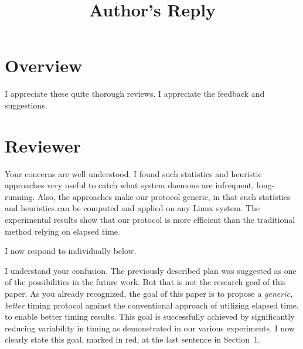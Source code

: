 \documentclass[10pt,letterpaper]{article}
\newenvironment{myindentpar}[1]%
{\begin{list}{}
         {\vspace{10pt}
					\setlength{\leftmargin}{#1}}
          \item[]
}
{\end{list}}
\newcommand{\rev}[1]{\begin{myindentpar}{.25in} {\em {\color{blue}{#1}}}\end{myindentpar}}
\begin{document}
\title{Author's Reply}
\author{}
\maketitle

\section*{Overview}\label{sec:overview}
I appreciate these quite thorough reviews. I appreciate the feedback and suggestions.


\clearpage
\section*{Reviewer}\label{sec:rev1}

\rev{
$<<$ Reviewer's comments to the author(s) $>>$

The SEDONA is based on the probability that any daemons run during the
measurement. And cutoff time is based on the actual measurement time.
The proposed approach is interesting, but I cannot understand why the
author employs such statistics and heuristic way, and how efficient the
proposed approach will work. Please refer to my comments, and consider
to revise the manuscript and re-submit .
}

Your concerns are well understood. I found such statistics and heuristic approaches 
very useful to catch what system daemons are infrequent, long-running. 
Also, the approaches make our protocol generic, in that 
such statistics and heuristics can be computed and 
applied on any Linux system. The experimental results show that 
our protocol is more efficient than the traditional method relying on elapsed time. 

I now respond to individually below.

\rev{
Comments: 
(1) In the last of the manuscript, the author describes ``Our plan is to
integrate SEDONA into the query timing protocol [8]." If the research
goal is the combination of the SEDONA and the query timing protocol,
the proposed approach may be suitable. However, the goal is not
clearly described in the manuscript. The readers will recognize the
SEDONA is a generic protocol. If the research goal is the combination
of this work and the prior work, the author should mention so.
}

I understand your confusion. The previously described plan was suggested as one of the possibilities in the future work. But that is not the research goal of this paper. 
As you already recognized, the goal of this paper is to propose a {\em generic, better} timing protocol against the conventional approach of utilizing elapsed time, 
to enable better timing results. This goal is successfully achieved 
by significantly reducing variability in timing as demonstrated in our various experiments.
I now clearly state this goal, marked in red, at the last sentence in Section~1. 
\end{document}

